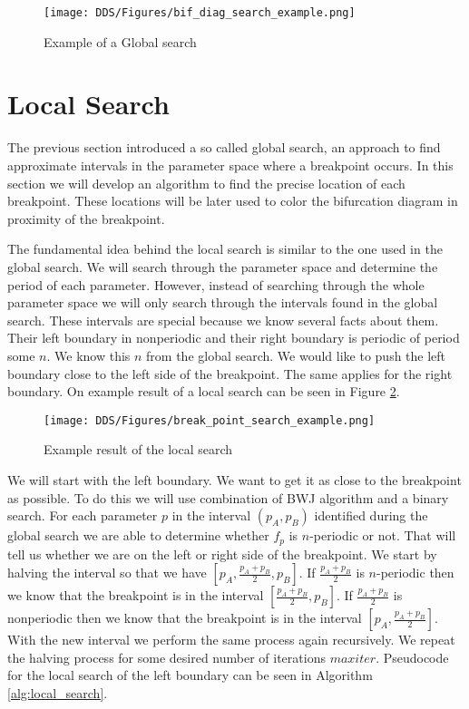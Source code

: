 \begin{figure}[!h]
    \centering
    \texttt{[image: DDS/Figures/bif\_diag\_search\_example.png]}
    \caption{Example of a Global search}
    \label{fig:bif_diag_search_example}
\end{figure}

\section{Local Search}
The previous section introduced a so called global search, an approach to find approximate intervals in the parameter space where a breakpoint occurs.
In this section we will develop an algorithm to find the precise location of each breakpoint.
These locations will be later used to color the bifurcation diagram in proximity of the breakpoint.
\par
The fundamental idea behind the local search is similar to the one used in the global search.
We will search through the parameter space and determine the period of each parameter.
However, instead of searching through the whole parameter space we will only search through the intervals found in the global search.
These intervals are special because we know several facts about them.
Their left boundary in nonperiodic and their right boundary is periodic of period some $n$. We know this $n$ from the global search.
We would like to push the left boundary close to the left side of the breakpoint.
The same applies for the right boundary.
On example result of a local search can be seen in Figure \ref{fig:break_point_search_example}.

\begin{figure}[!h]
    \centering
    \texttt{[image: DDS/Figures/break\_point\_search\_example.png]}
    \caption{Example result of the local search}
    \label{fig:break_point_search_example}
\end{figure}



\par
We will start with the left boundary. We want to get it as close to the breakpoint as possible.
To do this we will use combination of BWJ algorithm and a binary search.
For each parameter $p$ in the interval $(p_{A}, p_{B})$ identified during the global search we are able to determine whether $f_{p}$ is $n$-periodic or not.
That will tell us whether we are on the left or right side of the breakpoint.
We start by halving the interval so that we have $[p_{A}, \frac{p_{A}+p_{B}}{2}, p_{B}]$.
If $\frac{p_{A}+p_{B}}{2}$ is $n$-periodic then we know that the breakpoint is in the interval $[\frac{p_{A}+p_{B}}{2}, p_{B}]$.
If $\frac{p_{A}+p_{B}}{2}$ is nonperiodic then we know that the breakpoint is in the interval $[p_{A}, \frac{p_{A}+p_{B}}{2}]$.
With the new interval we perform the same process again recursively.
We repeat the halving process for some desired number of iterations $maxiter$.
Pseudocode for the local search of the left boundary can be seen in Algorithm \ref{alg:local_search}.

